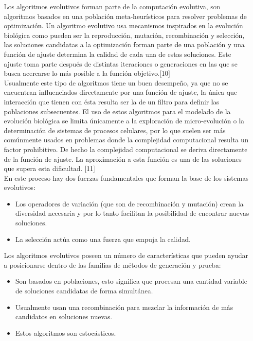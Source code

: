Los algoritmos evolutivos forman parte de la computación evolutiva, son algoritmos basados en una población meta-heurísticos para resolver problemas de optimización. Un algoritmo evolutivo usa mecanismos inspirados en la evolución biológica como pueden ser la reproducción, mutación, recombinación y selección, las soluciones candidatas a la optimización forman parte de una población y una función de ajuste determina la calidad de cada una de estas soluciones. Este ajuste toma parte después de distintas iteraciones o generaciones en las que se busca acercarse lo más posible a la función objetivo.[10] \\

Usualmente este tipo de algoritmos tiene un buen desempeño, ya que no se encuentran influenciados directamente por una función de ajuste, la única que interacción que tienen con ésta resulta ser la de un filtro para definir las poblaciones subsecuentes. El uso de estos algoritmos para el modelado de la evolución biológica se limita únicamente a la exploración de micro-evolución o la determinación de sistemas de procesos celulares, por lo que suelen ser más comúnmente usados en problemas donde la complejidad computacional resulta un factor prohibitivo. De hecho la complejidad computacional se deriva directamente de la función de ajuste. La aproximación a esta función es una de las soluciones que supera esta dificultad. [11] \\

En este proceso hay dos fuerzas fundamentales que forman la base de los sistemas evolutivos: \\
\begin{itemize}
\item Los operadores de variación (que son de recombinación y mutación) crean la diversidad necesaria y por lo tanto facilitan la posibilidad de encontrar nuevas soluciones.
\item La selección actúa como una fuerza que empuja la calidad.
\end{itemize}

Los algoritmos evolutivos poseen un número de características que pueden ayudar a posicionarse dentro de las familias de métodos de generación y prueba:

\begin{itemize}
\item Son basados en poblaciones, esto significa que procesan una cantidad variable de soluciones candidatas de forma simultánea.
\item Usualmente usan una recombinación para mezclar la información de más candidatos en soluciones nuevas.
\item Estos algoritmos son estocásticos.
\end{itemize}


